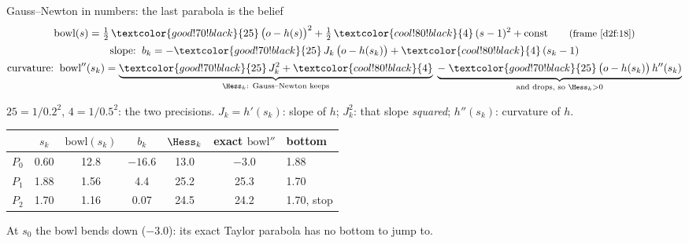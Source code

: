 \begin{frame}[t]{Gauss--Newton in numbers: the last parabola is the belief}
  \label{d2f:20}
  \centering
  \vspace{-1.6em}
  \[ \begin{gathered}
    \text{bowl}(s) = \tfrac12\,\textcolor{good!70!black}{25}\,\big(o-h(s)\big)^2 + \tfrac12\,\textcolor{cool!80!black}{4}\,(s-1)^2 + \text{const} \qquad \text{\small (frame \ref{d2f:18})}
  \\[0.05em]
    \text{slope:}\;\; b_k = -\textcolor{good!70!black}{25}\,J_k\,\big(o-h(s_k)\big) + \textcolor{cool!80!black}{4}\,(s_k-1)
  \\[0.05em]
    \text{curvature:}\;\; \text{bowl}''(s_k) = \underbrace{\textcolor{good!70!black}{25}\,J_k^2 + \textcolor{cool!80!black}{4}}_{\Hess_k\text{: Gauss--Newton keeps}}
      \;\underbrace{-\;\textcolor{good!70!black}{25}\,\big(o-h(s_k)\big)\,h''(s_k)}_{\text{and drops, so } \Hess_k > 0}
  \end{gathered} \]
  \vspace{-0.2em}
  {\footnotesize \textcolor{good!70!black}{$25 = 1/0.2^2$}, \textcolor{cool!80!black}{$4 = 1/0.5^2$}: the two precisions.\;
   $J_k = h'(s_k)$: slope of $h$; $J_k^2$: that slope \emph{squared}; $h''(s_k)$: curvature of $h$.\par}\vspace{0.3em}
  \renewcommand{\arraystretch}{1.0}
  \begin{tabular}{@{}l@{\qquad}c@{\qquad}c@{\qquad}c@{\qquad}c@{\qquad}c@{\qquad}l@{}}
    \toprule
    & $s_k$ & $\text{bowl}(s_k)$ & $b_k$ & $\Hess_k$ & exact $\text{bowl}''$ & bottom \\
    \midrule
    \textcolor{accent}{$P_0$} & 0.60 & 12.8 & $-16.6$ & 13.0 & \textcolor{accent}{$-3.0$} & 1.88\\
    \textcolor{prob}{$P_1$} & 1.88 & 1.56 & 4.4 & 25.2 & 25.3 & 1.70\\
    \textcolor{cool!80!black}{$P_2$} & 1.70 & 1.16 & 0.07 & 24.5 & 24.2 & 1.70, stop\\
    \bottomrule
  \end{tabular}\par\vspace{0.05em}
  {\footnotesize At $s_0$ the bowl bends down ($-3.0$): its exact Taylor parabola has no bottom to jump to.\par}
  \vfill
\end{frame}



